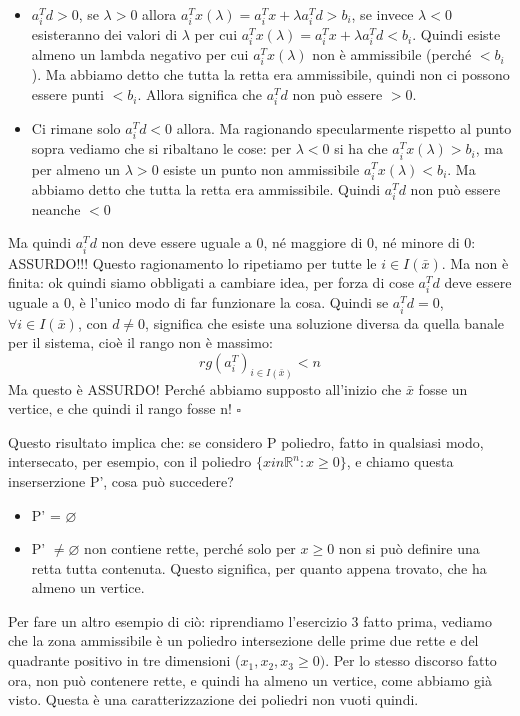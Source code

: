 \begin{itemize}
    \item $a_i^Td > 0$, se $\lambda > 0$ allora $a_i^Tx(\lambda) = a_i^Tx + \lambda a_i^Td > b_i$, se invece $\lambda < 0$ esisteranno dei valori di $\lambda$ per cui $a_i^Tx(\lambda) = a_i^Tx + \lambda a_i^Td < b_i$. Quindi esiste almeno un lambda negativo per cui $a_i^Tx(\lambda)$ non è ammissibile (perché $< b_i$). Ma abbiamo detto che tutta la retta era ammissibile, quindi non ci possono essere punti $< b_i$. Allora significa che $a_i^T d$ non può essere $> 0$.
    \item Ci rimane solo $a_i^T d < 0$ allora. Ma ragionando specularmente rispetto al punto sopra vediamo che si ribaltano le cose: per $\lambda < 0$ si ha che $a_i^Tx(\lambda) > b_i$, ma per almeno un $\lambda > 0$ esiste un punto non ammissibile $a_i^Tx(\lambda) < b_i$. Ma abbiamo detto che tutta la retta era ammissibile. Quindi $a_i^Td$ non può essere neanche $< 0$
\end{itemize}
Ma quindi $a_i^Td$ non deve essere uguale a 0, né maggiore di 0, né minore di 0: ASSURDO!!! Questo ragionamento lo ripetiamo per tutte le $i \in I(\bar{x})$. Ma non è finita: ok quindi siamo obbligati a cambiare idea, per forza di cose $a_i^Td$ deve essere uguale a 0, è l'unico modo di far funzionare la cosa. Quindi se $a_i^T d = 0$, $\forall i \in I(\bar{x})$, con $d \neq 0$, significa che esiste una soluzione diversa da quella banale per il sistema, cioè il rango non è massimo:
\begin{equation*}
    rg(a_i^T)_{i \in I(\bar{x})} < n
\end{equation*}
Ma questo è ASSURDO! Perché abbiamo supposto all'inizio che $\bar{x}$ fosse un vertice, e che quindi il rango fosse n! $\square$

\vspace{1cm}

\noindent Questo risultato implica che: se considero P poliedro, fatto in qualsiasi modo, intersecato, per esempio, con il poliedro $\{x in \mathbb{R}^n: x \geq 0\}$, e chiamo questa inserserzione P', cosa può succedere?
\begin{itemize}
    \item P' = $\varnothing$
    \item P' $\neq \varnothing$ non contiene rette, perché solo per $x \geq 0$ non si può definire una retta tutta contenuta. Questo significa, per quanto appena trovato, che ha almeno un vertice. 
\end{itemize} 
Per fare un altro esempio di ciò: riprendiamo l'esercizio 3 fatto prima, vediamo che la zona ammissibile è un poliedro intersezione delle prime due rette e del quadrante positivo in tre dimensioni ($x_1,x_2,x_3 \geq 0)$. Per lo stesso discorso fatto ora, non può contenere rette, e quindi ha almeno un vertice, come abbiamo già visto. Questa è una caratterizzazione dei poliedri non vuoti quindi.



